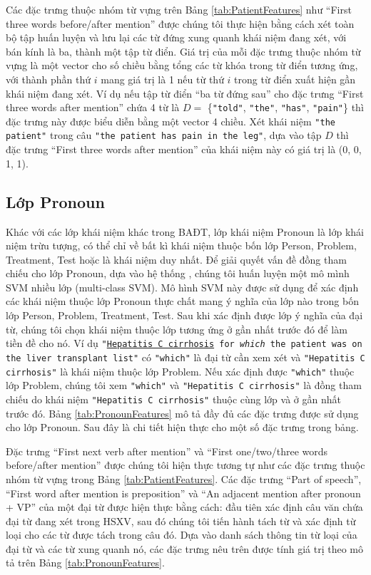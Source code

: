 Các đặc trưng thuộc nhóm từ vựng trên Bảng \ref{tab:PatientFeatures} như ``First three words before/after mention'' được chúng tôi thực hiện bằng cách xét toàn bộ tập huấn luyện và lưu lại các từ đứng xung quanh khái niệm đang xét, với bán kính là ba, thành một tập từ điển. Giá trị của mỗi đặc trưng thuộc nhóm từ vựng là một vector cho số chiều bằng tổng các từ khóa trong từ điển tương ứng, với thành phần thứ $i$ mang giá trị là 1 nếu từ thứ $i$ trong từ điển xuất hiện gần khái niệm đang xét. Ví dụ nếu tập từ điển ``ba từ đứng sau'' cho đặc trưng ``First three words after mention'' chứa 4 từ là $D=$ \{\texttt{"told"}, \texttt{"the"}, \texttt{"has"}, \texttt{"pain"}\} thì đặc trưng này được biểu diễn bằng một vector 4 chiều. Xét khái niệm \texttt{"the patient"} trong câu \texttt{"the patient has pain in the leg"}, dựa vào tập $D$ thì đặc trưng ``First three words after mention'' của khái niệm này có giá trị là (0, 0, 1, 1).

\subsection*{Lớp Pronoun}
Khác với các lớp khái niệm khác trong BAĐT, lớp khái niệm Pronoun là lớp khái niệm trừu tượng, có thể chỉ về bất kì khái niệm thuộc bốn lớp Person, Problem, Treatment, Test hoặc là khái niệm duy nhất. Để giải quyết vấn đề đồng tham chiếu cho lớp Pronoun, dựa vào hệ thống \cite{YanXu2012}, chúng tôi huấn luyện một mô mình SVM nhiều lớp (multi-class SVM). Mô hình SVM này được sử dụng để xác định các khái niệm thuộc lớp Pronoun thực chất mang ý nghĩa của lớp nào trong bốn lớp Person, Problem, Treatment, Test. Sau khi xác định được lớp ý nghĩa của đại từ, chúng tôi chọn khái niệm thuộc lớp tương ứng ở gần nhất trước đó để làm tiền đề cho nó. Ví dụ \texttt{"\underline{Hepatitis C cirrhosis} for \textsl{which} the patient was on the liver transplant list"} có \texttt{"which"} là đại từ cần xem xét và \texttt{"Hepatitis C cirrhosis"} là khái niệm thuộc lớp Problem. Nếu xác định được \texttt{"which"} thuộc lớp Problem, chúng tôi xem \texttt{"which"} và \texttt{"Hepatitis C cirrhosis"} là đồng tham chiếu do khái niệm \texttt{"Hepatitis C cirrhosis"} thuộc cùng lớp và ở gần nhất trước đó. Bảng \ref{tab:PronounFeatures} mô tả đầy đủ các đặc trưng được sử dụng cho lớp Pronoun. Sau đây là chi tiết hiện thực cho một số đặc trưng trong bảng.

Đặc trưng ``First next verb after mention'' và ``First one/two/three words before/after mention'' được chúng tôi hiện thực tương tự như các đặc trưng thuộc nhóm từ vựng trong Bảng \ref{tab:PatientFeatures}. Các đặc trưng ``Part of speech'', ``First word after mention is preposition'' và ``An adjacent mention after pronoun + VP'' của một đại từ được hiện thực bằng cách: đầu tiên xác định câu văn chứa đại từ đang xét trong HSXV, sau đó chúng tôi tiến hành tách từ và xác định từ loại cho các từ được tách trong câu đó. Dựa vào danh sách thông tin từ loại của đại từ và các từ xung quanh nó, các đặc trưng nêu trên được tính giá trị theo mô tả trên Bảng \ref{tab:PronounFeatures}.

